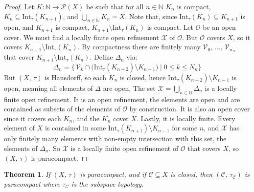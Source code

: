 \documentclass{article}
\theoremstyle{plain}
\newtheorem{theorem}{Theorem}[section]
\theoremstyle{normal}
\begin{document}
        \begin{proof}
            Let $K:\mathbb{N}\rightarrow\mathcal{P}(X)$ be such that
            for all $n\in\mathbb{N}$ $K_{n}$ is compact,
            $K_{n}\subseteq\textrm{Int}_{\tau}(K_{n+1})$, and
            $\bigcup_{n\in\mathbb{N}}K_{n}=X$. Note that, since
            $\textrm{Int}_{\tau}(K_{n})\subseteq{K}_{n+1}$ is open, and
            $K_{n+1}$ is compact, $K_{n+1}\setminus\textrm{Int}_{\tau}(K_{n})$
            is compact. Let $\mathcal{O}$ be an open cover. We must find a
            locally finite open refinement $\mathcal{X}$ of $\mathcal{O}$.
            But $\mathcal{O}$ covers $X$, so it covers
            $K_{n+1}\setminus\textrm{Int}_{\tau}(K_{n})$. By compactness there
            are finitely many $\mathcal{V}_{0},\,\dots,\,\mathcal{V}_{n_{N}}$
            that cover $K_{n+1}\setminus\textrm{Int}_{\tau}(K_{n})$.
            Define $\Delta_{n}$ via:
            \begin{equation}
                \Delta_{n}=
                \Big\{\,\mathcal{V}_{k}\cap\big(\textrm{Int}_{\tau}(K_{n+2})
                    \setminus{K}_{n-1}\big)\;|\;0\leq{k}\leq{N}_{n}\Big\}
            \end{equation}
            But $(X,\,\tau)$ is Hausdorff, so each $K_{n}$ is closed, hence
            $\textrm{Int}_{\tau}(K_{n+2})\setminus{K}_{n-1}$ is open, meaning
            all elements of $\Delta$ are open. The set
            $\mathcal{X}=\bigcup_{n\in\mathbb{N}}\Delta_{n}$ is a locally finite
            open refinement. It is an open refinement, the elements are open
            and are contained as subsets of the elements of $\mathcal{O}$ by
            construction. It is also an open cover since it covers each
            $K_{n}$, and the $K_{n}$ cover $X$. Lastly, it is locally finite.
            Every element of $X$ is contained in some
            $\textrm{Int}_{\tau}(K_{n+1})\setminus{K}_{n-1}$ for some $n$,
            and $\mathcal{X}$ has only finitely many elements with non-empty
            intersection with this set, the elements of $\Delta_{n}$. So
            $\mathcal{X}$ is a locally finite open refinement of $\mathcal{O}$
            that covers $X$, so $(X,\,\tau)$ is paracompact.
        \end{proof}
        \begin{theorem}
            If $(X,\,\tau)$ is paracompact, and if $\mathcal{C}\subseteq{X}$ is
            closed, then $(\mathcal{C},\,\tau_{\mathcal{C}})$ is paracompact
            where $\tau_{\mathcal{C}}$ is the subspace topology.
        \end{theorem}
\end{document}
